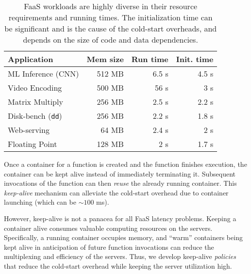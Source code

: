 \begin{table}
  \caption{FaaS workloads are highly diverse in their resource requirements and running times. The initialization time can be significant and is the cause of the cold-start overheads, and depends on the size of code and data dependencies.}
  \begin{tabular}{lrrr}
    \hline 
    Application & Mem size & Run time & Init. time \\
    \hline
    ML Inference (CNN) & 512 MB & 6.5 s & 4.5 s \\
    Video Encoding & 500 MB & 56 s & 3 s \\
    Matrix Multiply & 256 MB & 2.5 s & 2.2 s \\
    Disk-bench (\texttt{dd})  & 256 MB & 2.2 s & 1.8 s \\
    Web-serving & 64 MB & 2.4 s & 2 s \\
    Floating Point & 128 MB & 2 s & 1.7 s \\

    \hline
  \end{tabular}
  \label{tab:workloads}
\end{table}



Once a container for a function is created and the function finishes execution, the container can be kept alive instead of immediately terminating it. 
Subsequent invocations of the function can then \emph{reuse} the already running container.
This \emph{keep-alive} mechanism can alleviate the cold-start overhead due to container launching (which can be $\sim 100$ ms). %



However, keep-alive is not a panacea for all FaaS latency problems. 
Keeping a container alive consumes valuable computing resources on the servers. %
Specifically, a running container occupies memory, and ``warm'' containers being kept alive in anticipation of future function invocations can reduce the multiplexing and efficiency of the servers. 
Thus, we develop keep-alive \emph{policies} that reduce the cold-start overhead while keeping the server utilization high.
%

